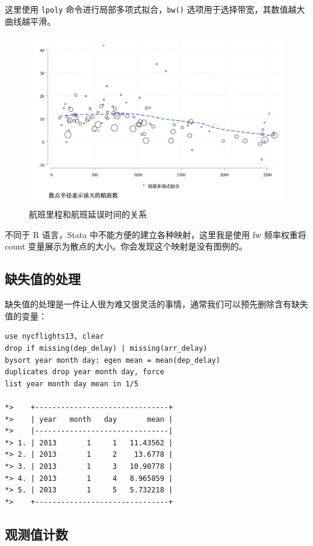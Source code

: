 这里使用 \texttt{lpoly} 命令进行局部多项式拟合，\texttt{bw()} 选项用于选择带宽，其数值越大曲线越平滑。

\begin{figure}[htbp]
  \centering
  \includegraphics[width=\textwidth]{assets/delaydist.png}
  \caption{航班里程和航班延误时间的关系}
  \label{fig:delaydist}
\end{figure}

不同于 R 语言，Stata 中不能方便的建立各种映射，这里我是使用 fw 频率权重将 count 变量展示为散点的大小。你会发现这个映射是没有图例的。

\subsection{缺失值的处理}

缺失值的处理是一件让人很为难又很灵活的事情，通常我们可以预先删除含有缺失值的变量：

\begin{lstlisting}
use nycflights13, clear
drop if missing(dep_delay) | missing(arr_delay)
bysort year month day: egen mean = mean(dep_delay)
duplicates drop year month day, force
list year month day mean in 1/5

*>    +-------------------------------+
*>    | year   month   day       mean |
*>    |-------------------------------|
*> 1. | 2013       1     1   11.43562 |
*> 2. | 2013       1     2    13.6778 |
*> 3. | 2013       1     3   10.90778 |
*> 4. | 2013       1     4   8.965859 |
*> 5. | 2013       1     5   5.732218 |
*>    +-------------------------------+
\end{lstlisting}

\subsection{观测值计数}

